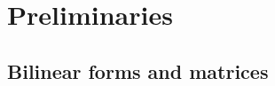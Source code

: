 \documentclass[12pt]{article}
\newcommand{\AZ}[1]{{\color{red}\textbf{AZ}:~#1}}
\begin{document}

\section{Preliminaries}

\subsection{Bilinear forms and matrices}
\end{document}

